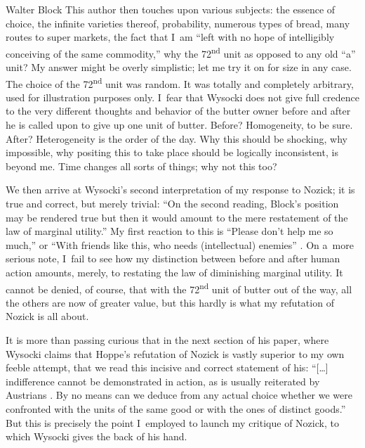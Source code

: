 \begin{artengenv}{Walter Block}
This author then touches upon various subjects: the essence of choice, the infinite varieties thereof, probability, numerous types of bread, many routes to super markets, the fact that I~am ``left with no hope of intelligibly conceiving of the same commodity,'' why the 72\textsuperscript{nd} unit as opposed to any old ``a'' unit? My answer might be overly simplistic; let me try it on for size in any case. The choice of the 72\textsuperscript{nd} unit was random. It was totally and completely arbitrary, used for illustration purposes only. I~fear that Wysocki does not give full credence to the very different thoughts and behavior of the butter owner before and after he is called upon to give up one unit of butter. Before? Homogeneity, to be sure. After? Heterogeneity is the order of the day. Why this should be shocking, why impossible, why positing this to take place should be logically inconsistent, is beyond me. Time changes all sorts of things; why not this too?

We then arrive at Wysocki's second interpretation of my response to Nozick; it is true and correct, but merely trivial: ``On the second reading, Block's position may be rendered true but then it would amount to the mere restatement of the law of marginal utility.'' My first reaction to this is ``Please don't help me so much,'' or ``With friends like this, who needs (intellectual) enemies'' \parencite[in this regard see][]{riley_please_2016}. %
 On a~more serious note, I~fail to see how my distinction between before and after human action amounts, merely, to restating the law of diminishing marginal utility. It cannot be denied, of course, that with the 72\textsuperscript{nd} unit of butter out of the way, all the others are now of greater value, but this hardly is what my refutation of Nozick is all about.

It is more than passing curious that in the next section of his paper, where Wysocki claims that Hoppe's refutation of Nozick is vastly superior to my own feeble attempt, that we read this incisive and correct statement of his: ``[…] indifference cannot be demonstrated in action, as is usually reiterated by Austrians
\parencites[][]{block_rejoinder_2009}[][]{block_rejoinder_2010}[][]{rothbard_toward_2011}. %
 By no means can we deduce from any actual choice whether we were confronted with the units of the same good or with the ones of distinct goods.'' But this is precisely the point I~employed to launch my critique of Nozick, to which Wysocki gives the back of his hand.


\end{artengenv}
